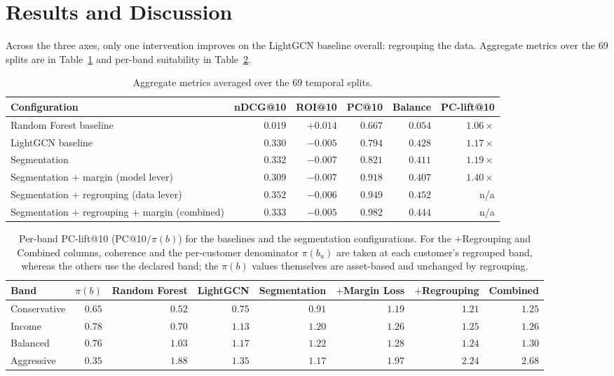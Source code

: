 \section{Results and Discussion}
\label{sec:results}

Across the three axes, only one intervention improves on the LightGCN baseline overall: regrouping the data. Aggregate metrics over the 69 splits are in Table~\ref{tab:aggregate} and per-band suitability in Table~\ref{tab:perband}.

\begin{table}[!t]
\centering
\small
\begin{tabular}{lrrrrr}
\toprule
Configuration & nDCG@10 & ROI@10 & PC@10 & Balance & PC-lift@10 \\
\midrule
Random Forest baseline                          & $0.019$ & $+0.014$ & $0.667$ & $0.054$ & $1.06\times$ \\
LightGCN baseline                               & $0.330$ & $-0.005$ & $0.794$ & $0.428$ & $1.17\times$ \\
\midrule
Segmentation                                    & $0.332$ & $-0.007$ & $0.821$ & $0.411$ & $1.19\times$ \\
Segmentation $+$ margin (model lever)           & $0.309$ & $-0.007$ & $0.918$ & $0.407$ & $1.40\times$ \\
Segmentation $+$ regrouping (data lever)        & $0.352$ & $-0.006$ & $0.949$ & $\mathbf{0.452}$ & n/a \\
Segmentation $+$ regrouping $+$ margin (combined) & $0.333$ & $-0.005$ & $0.982$ & $0.444$ & n/a \\
\bottomrule
\end{tabular}
\caption{Aggregate metrics averaged over the 69 temporal splits.}
\label{tab:aggregate}
\end{table}

\begin{table}[!t]
\centering
\small
\begin{tabular}{lrrrrrrr}
\toprule
Band & $\pi(b)$ & Random Forest & LightGCN & Segmentation & $+$Margin Loss & $+$Regrouping & Combined \\
\midrule
Conservative & $0.65$ & $0.52$ & $0.75$ & $0.91$ & $1.19$ & $1.21$ & $1.25$ \\
Income       & $0.78$ & $0.70$ & $1.13$ & $1.20$ & $1.26$ & $1.25$ & $1.26$ \\
Balanced     & $0.76$ & $1.03$ & $1.17$ & $1.22$ & $1.28$ & $1.24$ & $1.30$ \\
Aggressive   & $0.35$ & $1.88$ & $1.35$ & $1.17$ & $1.97$ & $2.24$ & $2.68$ \\
\bottomrule
\end{tabular}
\caption{Per-band PC-lift@10 (PC@10$/\pi(b)$) for the baselines and the segmentation configurations. For the $+$Regrouping and Combined columns, coherence and the per-customer denominator $\pi(b_u)$ are taken at each customer's regrouped band, whereas the others use the declared band; the $\pi(b)$ values themselves are asset-based and unchanged by regrouping.}
\label{tab:perband}
\end{table}

